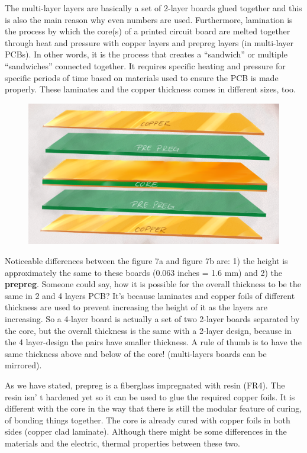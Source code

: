 \documentclass[final]{cubedoc}
\begin{document}
	The multi-layer layers are basically a set of 2-layer boards glued together and this is also the main reason why even numbers are used. Furthermore, lamination is the process by which the core(s) of a printed circuit board are melted together through heat and pressure with copper layers and prepreg layers (in multi-layer PCBs). In other words, it is the process that creates a “sandwich” or multiple “sandwiches” connected together. It requires specific heating and pressure for specific periods of time based on materials used to ensure the PCB is made properly.  These laminates and the copper thickness comes in different sizes, too.
	
	
	\begin{figure}[h!]
		\centering
		\includegraphics[height=.25\textheight]{assets/multi-layer-lamination.png}
		\caption{}
		\label{fig:my_label}
	\end{figure}
	
	Noticeable differences between the figure 7a and figure 7b are: 1) the height is approximately the same to these boards (0.063 inches = 1.6 mm) and 2) the \textbf{prepreg}. Someone could say, how it is possible for the overall thickness to be the same in 2 and 4 layers PCB? It’s because laminates and copper foils of different thickness are used to prevent increasing the height of it as the layers are increasing. So a 4-layer board is actually a set of two 2-layer boards separated by  the core, but the overall thickness is the same with a 2-layer design, because in the 4 layer-design the pairs have smaller thickness. A rule of thumb is to have the same thickness above and below of the core! (multi-layers boards can be mirrored).
	
	As we have stated, prepreg is a fiberglass impregnated with resin (FR4). The resin isn'
	t hardened yet so it can be used to glue the required copper foils. It is different with the core in the way that there is still the modular feature of curing, of bonding things together. The core is already cured with copper foils in both sides (copper clad laminate). Although there might be some differences in the materials and the electric, thermal properties between these two.
	
\end{document}
